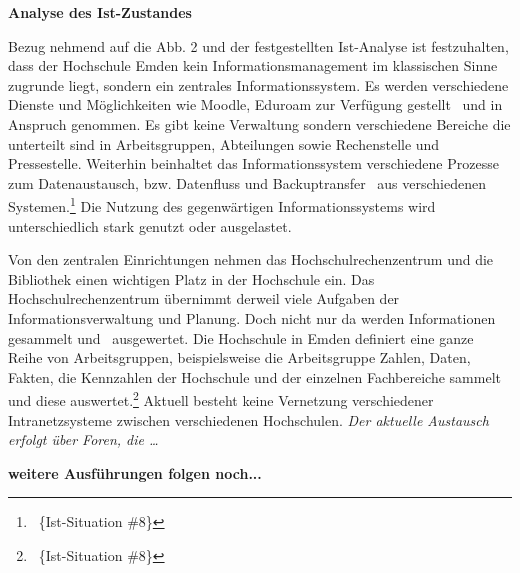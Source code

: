 \documentclass[a4paper]{article}
\newcommand\textstyleFootnoteSymbol[1]{#1}
\newcommand\textstyleAbsatzStandardschriftart[1]{#1}
\begin{document}
\clearpage
\bigskip

{\sffamily\bfseries
Analyse des Ist-Zustandes}

\textsf{Bezug nehmend auf die Abb. 2 und der festgestellten Ist-Analyse ist festzuhalten, dass der Hochschule Emden kein
Informationsmanagement im klassischen Sinne zugrunde liegt, sondern ein zentrales Informationssystem. Es werden
verschiedene Dienste und Möglichkeiten wie Moodle, Eduroam zur Verfügung gestellt \ und in Anspruch genommen. Es gibt
keine Verwaltung sondern verschiedene Bereiche die unterteilt sind in Arbeitsgruppen, Abteilungen sowie Rechenstelle
und Pressestelle. Weiterhin beinhaltet das Informationssystem verschiedene Prozesse zum Datenaustausch, bzw. Datenfluss
und Backuptransfer \ aus verschiedenen Systemen.}\footnote{\ \{Ist-Situation \#8\}}\textstyleFootnoteSymbol{\textsf{
}}\textsf{Die Nutzung des gegenwärtigen Informationssystems wird unterschiedlich stark genutzt oder ausgelastet. }

\textsf{Von den zentralen Einrichtungen nehmen das Hochschulrechenzentrum und die Bibliothek einen wichtigen Platz in
der Hochschule ein. Das Hochschulrechenzentrum übernimmt derweil viele Aufgaben der Informationsverwaltung und Planung.
Doch nicht nur da werden Informationen gesammelt und \ ausgewertet. Die Hochschule in Emden definiert eine ganze Reihe
von Arbeitsgruppen, beispielsweise die Arbeitsgruppe Zahlen, Daten, Fakten, die Kennzahlen der Hochschule und der
einzelnen Fachbereiche sammelt und diese auswertet.}\footnote{\ \{Ist-Situation \#8\}}\textsf{ Aktuell besteht keine
Vernetzung verschiedener Intranetzsysteme zwischen verschiedenen Hochschulen.
}\textstyleAbsatzStandardschriftart{\textsf{\textit{\textcolor[rgb]{0.8509804,0.8509804,0.8509804}{Der aktuelle
Austausch erfolgt über Foren, die …}}}}

\textstyleAbsatzStandardschriftart{\textsf{\textbf{\textcolor[rgb]{0.8,0.8,0.8}{weitere Ausführungen folgen noch...}}}}
\end{document}
